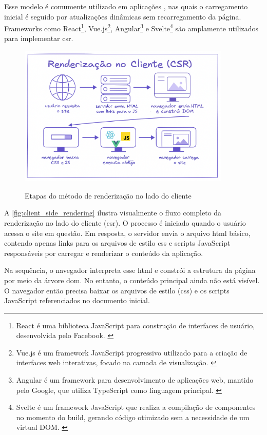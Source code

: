 Esse modelo é comumente utilizado em aplicações , nas quais o carregamento inicial é seguido por atualizações dinâmicas sem recarregamento da página. Frameworks como React\footnote{React é uma biblioteca JavaScript para construção de interfaces de usuário, desenvolvida pelo Facebook. \cite{react2025} }, Vue.js\footnote{Vue.js é um framework JavaScript progressivo utilizado para a criação de interfaces web interativas, focado na camada de visualização. \cite{vue2025} }, Angular\footnote{Angular é um framework para desenvolvimento de aplicações web, mantido pelo Google, que utiliza TypeScript como linguagem principal. \cite{angular2025} } e Svelte\footnote{Svelte é um framework JavaScript que realiza a compilação de componentes no momento do build, gerando código otimizado sem a necessidade de um virtual DOM. \cite{svelte2025} } são amplamente utilizados para implementar \acrshort{csr}.

\begin{figure}[h!]
    \centering
    \caption{Etapas do método de renderização no lado do cliente}
    \includegraphics[width=0.9\textwidth]{media/client_side_rendering.png}
    \label{fig:client_side_rendering}
\end{figure}

A \autoref{fig:client_side_rendering} ilustra visualmente o fluxo completo da renderização no lado do cliente (\acrshort{csr}). O processo é iniciado quando o usuário acessa o site em questão. Em resposta, o servidor envia o arquivo \acrshort{html} básico, contendo apenas links para os arquivos de estilo \acrshort{css} e scripts JavaScript responsáveis por carregar e renderizar o conteúdo da aplicação.

Na sequência, o navegador interpreta esse \acrshort{html} e constrói a estrutura da página por meio da árvore \acrshort{dom}. No entanto, o conteúdo principal ainda não está visível. O navegador então precisa baixar os arquivos de estilo (\acrshort{css}) e os scripts JavaScript referenciados no documento inicial.


